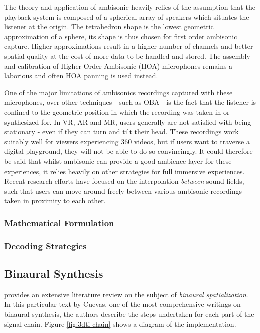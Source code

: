 The theory and application of ambisonic heavily relies of the assumption that the playback system is composed of a spherical array of speakers which situates the listener at the origin. The tetrahedron shape is the lowest geometric approximation of a sphere, its shape is thus chosen for first order ambisonic capture. Higher approximations result in a higher number of channels and better spatial quality at the cost of more data to be handled and stored. The assembly and calibration of Higher Order Ambisonic (HOA) microphones remains a laborious and often HOA panning is used instead.

One of the major limitations of ambisonics recordings captured with these microphones, over other techniques - such as OBA - is the fact that the listener is confined to the geometric position in which the recording was taken in or synthesized for. In VR, AR and MR, users generally are not satisfied with being stationary - even if they can turn and tilt their head. These recordings work suitably well for viewers experiencing 360 videos, but if users want to traverse a digital playground, they will not be able to do so convincingly. It could therefore be said that whilst ambisonic can provide a good ambience layer for these experiences, it relies heavily on other strategies for full immersive experiences. Recent research efforts have focused on the interpolation \textit{between} sound-fields, such that users can move around freely between various ambisonic recordings taken in proximity to each other. 

\subsubsection{Mathematical Formulation}

\subsubsection{Decoding Strategies}


\subsection{Binaural Synthesis}
\label{subsec:bin-synth}


\cite{cuevas20193d} provides an extensive literature review on the subject of \textit{binaural spatialization}. In this particular text by Cuevas, one of the most comprehensive writings on binaural synthesis, the authors describe the steps undertaken for each part of the signal chain. Figure \ref{fig:3dti-chain} shows a diagram of the implementation. 


